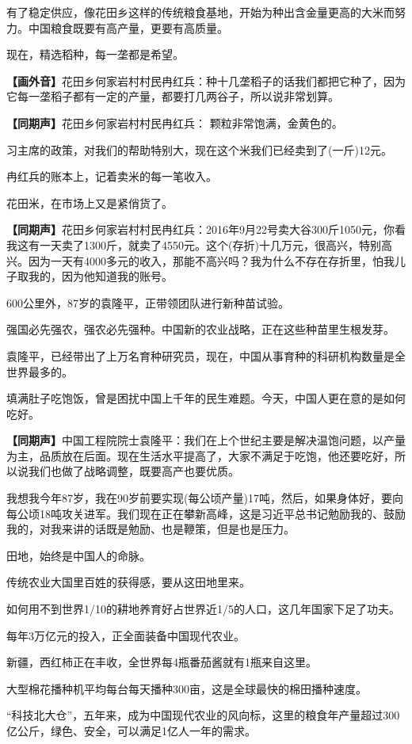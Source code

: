\documentclass{ctexart}
\newcommand{\zkh}[1]{\textbf{\hspace{-2.7em} 【#1】}}
\begin{document}
有了稳定供应，像花田乡这样的传统粮食基地，开始为种出含金量更高的大米而努力。中国粮食既要有高产量，更要有高质量。

 现在，精选稻种，每一垄都是希望。

 \zkh{画外音}花田乡何家岩村村民冉红兵：种十几垄稻子的话我们都把它种了，因为它每一垄稻子都有一定的产量，都要打几两谷子，所以说非常划算。

 \zkh{同期声}花田乡何家岩村村民冉红兵： 颗粒非常饱满，金黄色的。

 习主席的政策，对我们的帮助特别大，现在这个米我们已经卖到了(一斤)12元。

 冉红兵的账本上，记着卖米的每一笔收入。

 花田米，在市场上又是紧俏货了。

 \zkh{同期声}花田乡何家岩村村民冉红兵：2016年9月22号卖大谷300斤1050元，你看我这有一天卖了1300斤，就卖了4550元。这个(存折)十几万元，很高兴，特别高兴。因为一天有4000多元的收入，那能不高兴吗？我为什么不存在存折里，怕我儿子取我的，因为他知道我的账号。

 600公里外，87岁的袁隆平，正带领团队进行新种苗试验。

 强国必先强农，强农必先强种。中国新的农业战略，正在这些种苗里生根发芽。

袁隆平，已经带出了上万名育种研究员，现在，中国从事育种的科研机构数量是全世界最多的。

填满肚子吃饱饭，曾是困扰中国上千年的民生难题。今天，中国人更在意的是如何吃好。

 \zkh{同期声}中国工程院院士袁隆平：我们在上个世纪主要是解决温饱问题，以产量为主，品质放在后面。现在生活水平提高了，大家不满足于吃饱，他还要吃好，所以说我们也做了战略调整，既要高产也要优质。

我想我今年87岁，我在90岁前要实现(每公顷产量)17吨，然后，如果身体好，要向每公顷18吨攻关进军。我们现在正在攀新高峰，这是习近平总书记勉励我的、鼓励我的，对我来讲的话既是勉励、也是鞭策，但是也是压力。

 田地，始终是中国人的命脉。

 传统农业大国里百姓的获得感，要从这田地里来。

 如何用不到世界1/10的耕地养育好占世界近1/5的人口，这几年国家下足了功夫。

 每年3万亿元的投入，正全面装备中国现代农业。

 新疆，西红柿正在丰收，全世界每4瓶番茄酱就有1瓶来自这里。

 大型棉花播种机平均每台每天播种300亩，这是全球最快的棉田播种速度。

``科技北大仓''，五年来，成为中国现代农业的风向标，这里的粮食年产量超过300亿公斤，绿色、安全，可以满足1亿人一年的需求。
\end{document}
